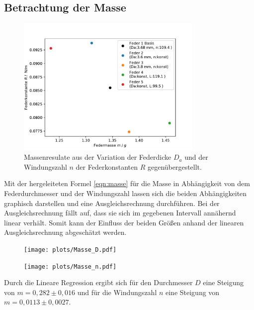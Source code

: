 \subsection{Betrachtung der Masse}
\begin{figure}[H]
  \center
  \includegraphics[width=0.8\textwidth]{plots/masse_konstante_dia.pdf}
  \caption{Massenresulate aus der Variation der Federdicke $D_a$
          und der Windungszahl $n$ der Federkonstanten $R$ gegenübergestellt. }
\end{figure}
Mit der hergeleiteten Formel \ref{eqn:masse} für die Masse in Abhängigkeit von dem Federdurchmesser und der Windungszahl lassen sich die beiden Abhängigkeiten graphisch darstellen und eine Ausgleichsrechnung durchführen.
Bei der Ausgleichsrechnung fällt auf, dass sie sich im gegebenen Intervall annähernd linear verhält. 
Somit kann der Einfluss der beiden Größen anhand der linearen Ausgleichsrechnung 
abgeschätzt werden.
\begin{figure}[H]
  \center
  \texttt{[image: plots/Masse\_D.pdf]}
  \caption{}
\end{figure}
\begin{figure}[H]
  \center
  \texttt{[image: plots/Masse\_n.pdf]}
  \caption{}
\end{figure}
Durch die Lineare Regression ergibt sich für den Durchmesser $D$ eine Steigung von $m = 0,282\pm0,016$ und für die Windungszahl $n$ eine Steigung von $m = 0,0113\pm0,0027$.
\label{sec:Auswertung}
